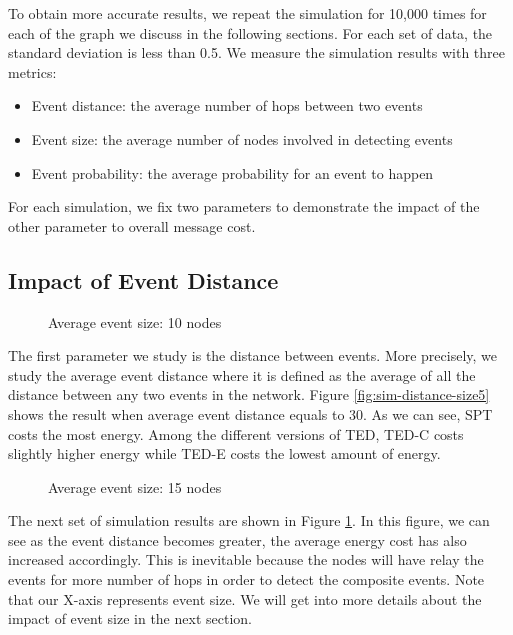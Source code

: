 To obtain more accurate results, we repeat the simulation for 10,000 times for each of the graph we discuss in the following sections. For each set of data, the standard deviation is less than 0.5. We measure the simulation results with three metrics:
\begin{itemize}
\item Event distance: the average number of hops between two events
\item Event size: the average number of nodes involved in detecting events
\item Event probability: the average probability for an event to happen
\end{itemize}

For each simulation, we fix two parameters to demonstrate the impact of the other parameter to overall message cost. 

\subsection{Impact of Event Distance}

\begin{figure}
\centering
{}
\caption{Average event size: 10 nodes}
\label{fig:sim-distance-size10}
\end{figure}

The first parameter we study is the distance between events. More precisely, we study the average event distance where it is defined as the average of all the distance between any two events in the network. Figure \ref{fig:sim-distance-size5} shows the result when average event distance equals to 30. As we can see, SPT costs the most energy. Among the different versions of TED, TED-C costs slightly higher energy while TED-E costs the lowest amount of energy.

\begin{figure}
\centering
{}
\caption{Average event size: 15 nodes}
\label{fig:sim-distance-size15}
\end{figure}

The next set of simulation results are shown in Figure \ref{fig:sim-distance-size10}. In this figure, we can see as the event distance becomes greater, the average energy cost has also increased accordingly. This is inevitable because the nodes will have relay the events for more number of hops in order to detect the composite events. Note that our X-axis represents event size. We will get into more details about the impact of event size in the next section.


